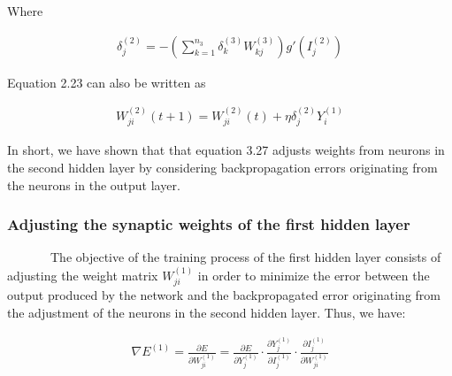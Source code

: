 \documentclass[
  12pt,
]{report}
\begin{document}
Where

\vspace{-1em}

\begin{equation}
\begin{aligned}
\delta_j^{(2)} = - \left( \sum_{k=1}^{n_3} \delta_k^{(3)} W_{kj}^{(3)} \right) g'(I_j^{(2)})
\label{eq:equation 3.27}
\end{aligned}
\end{equation} \vspace{-1em}

Equation 2.23 can also be written as

\vspace{-1em}

\begin{equation}
\begin{aligned}
W_{ji}^{(2)}(t+1) = W_{ji}^{(2)}(t) + \eta \delta_j^{(2)} Y_i^{(1)}
\label{eq:equation 3.28}
\end{aligned}
\end{equation} \vspace{-1em}

In short, we have shown that that equation 3.27 adjusts weights from
neurons in the second hidden layer by considering backpropagation errors
originating from the neurons in the output layer.

\subsubsection{Adjusting the synaptic weights of the first hidden
layer}\label{adjusting-the-synaptic-weights-of-the-first-hidden-layer}

~~~~~~~The objective of the training process of the first hidden layer
consists of adjusting the weight matrix \(W_{ji}^{(1)}\) in order to
minimize the error between the output produced by the network and the
backpropagated error originating from the adjustment of the neurons in
the second hidden layer. Thus, we have:

\vspace{-1em}

\begin{equation}
\begin{aligned}
\nabla E^{(1)} = \frac{\partial E}{\partial W_{ji}^{(1)}} = \frac{\partial E}{\partial Y_j^{(1)}} \cdot \frac{\partial Y_j^{(1)}}{\partial I_j^{(1)}} \cdot \frac{\partial I_j^{(1)}}{\partial W_{ji}^{(1)}}
\label{eq:equation 3.29}
\end{aligned}
\end{equation} \vspace{-1em}
\end{document}

